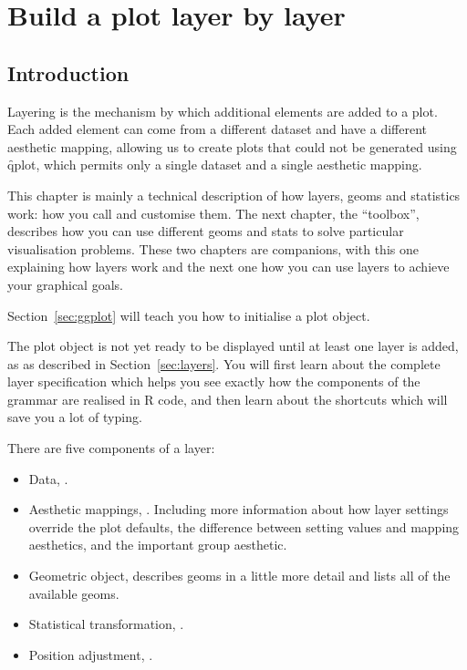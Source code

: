 

% 


\chapter{Build a plot layer by layer}
\label{cha:layers}

\section{Introduction}

Layering is the mechanism by which additional elements are added to a plot.  Each added element can come from a different dataset and have a different aesthetic mapping, allowing us to create plots that could not be generated using \f{qplot}, which permits only a single dataset and a single aesthetic mapping.

This chapter is mainly a technical description of how layers, geoms and statistics work: how you call and customise them.  The next chapter, the \ggplot ``toolbox'', describes how you can use different geoms and stats to solve particular visualisation problems.  These two chapters are companions, with this one explaining how layers work and the next one how you can use layers to achieve your graphical goals.

Section~\ref{sec:ggplot} will teach you how to initialise a plot object. 

The plot object is not yet ready to be displayed until at least one layer is added, as as described in Section~\ref{sec:layers}.  You will first learn about the complete layer specification which helps you see exactly how the components of the grammar are realised in R code, and then learn about the shortcuts which will save you a lot of typing.

There are five components of a layer:

\begin{itemize}
  \item Data, .

  \item Aesthetic mappings, .  Including more information about how layer settings override the plot defaults, the difference between setting values and mapping aesthetics, and the important group aesthetic.  

  \item Geometric object,  describes geoms in a little more detail and lists all of the available geoms. 

  \item Statistical transformation, .

  \item Position adjustment, .
\end{itemize}

